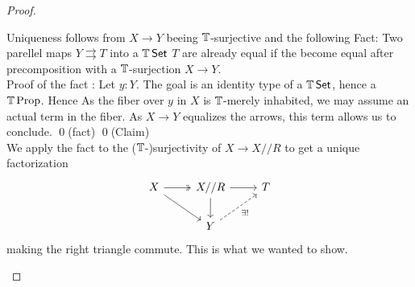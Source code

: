 \begin{proof}
\begin{itemize}
		Uniqueness follows from $X \to Y$ beeing $\mathbb{T}$-surjective and the following
		Fact: Two parellel maps $Y \rightrightarrows T$ into a $\mathbb{T} \operatorname{\mathsf {Set}}$ $T$ are already equal if the become equal after precomposition with a $\mathbb{T}$-surjection $X \to Y$.  \\
		Proof of the fact : Let $y : Y$. The goal is an identity type of a $\mathbb{T} \operatorname{\mathsf {Set}}$, hence a $\mathbb{T} \operatorname{Prop}$. Hence As the fiber over $y$ in $X$ is $\mathbb{T}$-merely inhabited, we may assume an actual term in the fiber. 	As $X \to Y$ equalizes the arrows, this term allows us to conclude. \qed (fact)	\qed(Claim) \\
		We apply the fact to the ($\mathbb{T}$-)surjectivity of $X \to X // R $ to get a unique factorization 
		\[\begin{tikzcd}
			X & {X // R} & T \\
			& Y
			\arrow[two heads, from=1-1, to=1-2]
			\arrow[from=1-1, to=2-2]
			\arrow[from=1-2, to=1-3]
			\arrow[from=1-2, to=2-2]
			\arrow["{\exists!}"', dashed, from=2-2, to=1-3]
		\end{tikzcd}\]
		making the right triangle commute. This is what we wanted to show.
	\end{itemize}
\end{proof}



